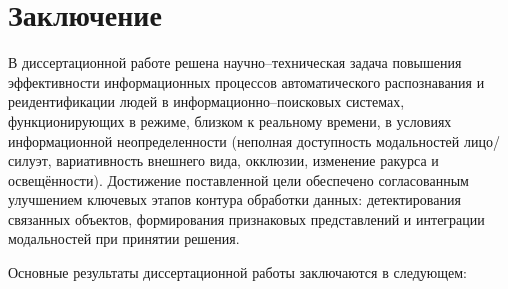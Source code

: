 \FloatBarrier

\section*{Заключение}

В диссертационной работе решена научно--техническая задача повышения эффективности
информационных процессов автоматического распознавания и реидентификации людей
в информационно--поисковых системах, функционирующих в режиме, близком к реальному
времени, в условиях информационной неопределенности (неполная доступность
модальностей лицо/силуэт, вариативность внешнего вида, окклюзии, изменение ракурса
и освещённости). Достижение поставленной цели обеспечено согласованным улучшением
ключевых этапов контура обработки данных: детектирования связанных объектов,
формирования признаковых представлений и интеграции модальностей при принятии
решения.

Основные результаты диссертационной работы заключаются в следующем:

